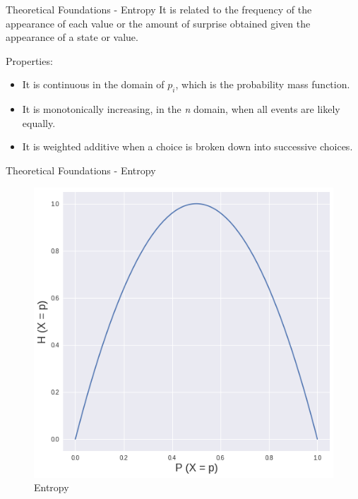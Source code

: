 \begin{frame}{{Theoretical Foundations - Entropy}}
It is related to the frequency of the appearance of each value or the amount of surprise obtained given the appearance of a state or value.

Properties:
\begin{itemize}
   \item It is continuous in the domain of $p_i$, which is the probability mass function.
    \item It is monotonically increasing, in the \textit{n} domain, when all events are likely equally.
    \item It is weighted additive when a choice is broken down into successive choices. 
\end{itemize}
\end{frame}

\begin{frame}{Theoretical Foundations - Entropy}

\begin{figure}
    \centering
    \includegraphics[scale=0.4]{figuras/entropy.png}
    \caption{Entropy}
    \label{fig:my_label}
\end{figure}

\end{frame}

